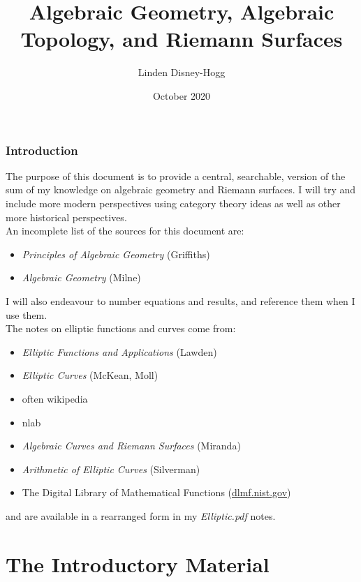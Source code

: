 \documentclass{article}
\title{Algebraic Geometry, Algebraic Topology, and Riemann Surfaces}
\author{Linden Disney-Hogg}
\date{October 2020}
\begin{document}
\maketitle
\tableofcontents

\section{Introduction}
The purpose of this document is to provide a central, searchable, version of the sum of my knowledge on algebraic geometry and Riemann surfaces. I will try and include more modern perspectives using category theory ideas as well as other more historical perspectives. \\
An incomplete list of the sources for this document are:
\begin{itemize}
	\item \textit{Principles of Algebraic Geometry} (Griffiths)
	\item \textit{Algebraic Geometry} (Milne)
\end{itemize}
I will also endeavour to number equations and results, and reference them when I use them. \\
The notes on elliptic functions and curves come from:
\begin{itemize}
	\item \textit{Elliptic Functions and Applications} (Lawden)
	\item \textit{Elliptic Curves} (McKean, Moll) 
	\item often wikipedia
	\item nlab
	\item \textit{Algebraic Curves and Riemann Surfaces} (Miranda)
	\item \textit{Arithmetic of Elliptic Curves} (Silverman)
	\item The Digital Library of Mathematical Functions (\href{dlmf.nist.gov}{dlmf.nist.gov})
\end{itemize} 
and are available in a rearranged form in my \textit{Elliptic.pdf} notes. 
\part{The Introductory Material}
\end{document}
